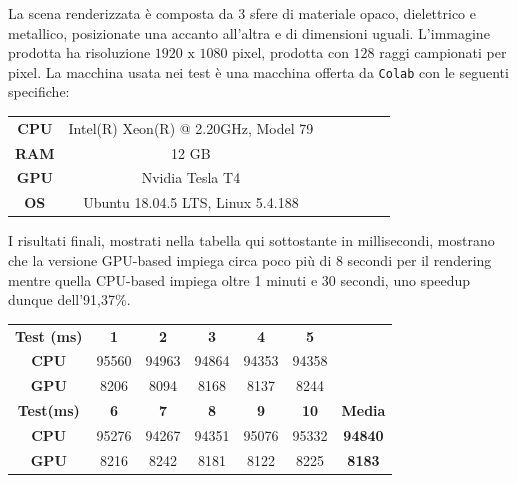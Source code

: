 \documentclass[12pt, twoside]{article}
\begin{document}
La scena renderizzata è composta da 3 sfere di materiale opaco, dielettrico
e metallico, posizionate una accanto all'altra e di dimensioni uguali.
L'immagine prodotta ha risoluzione $1920 \text{ x } 1080$ pixel, prodotta con
$128$ raggi campionati per pixel.
La macchina usata nei test è una macchina offerta da \texttt{Colab} con le
seguenti specifiche:

\begin{table}[h]
  \centering
  \begin{tabular}{ccccccc}
    \rowcolor[HTML]{EFEFEF} 
    \textbf{CPU} & Intel(R) Xeon(R) @ 2.20GHz, Model 79 \\
    \rowcolor[HTML]{FFFFFF} 
    \textbf{RAM} & 12 GB                                \\
    \rowcolor[HTML]{EFEFEF} 
    \textbf{GPU} & Nvidia Tesla T4                      \\
    \rowcolor[HTML]{FFFFFF} 
    \textbf{OS}  & Ubuntu 18.04.5 LTS, Linux 5.4.188   
  \end{tabular}
\end{table}

I risultati finali, mostrati nella tabella qui sottostante in millisecondi,
mostrano che la versione GPU-based impiega circa poco più di 8 secondi per il
rendering mentre quella CPU-based impiega oltre 1 minuti e 30 secondi,
uno speedup dunque dell'91,37\%.

\begin{table}[h]
  \centering
  \begin{tabular}{ccccccc}
    \rowcolor[HTML]{C0C0C0} 
    \textbf{Test (ms)}                   & \textbf{1}                    & \textbf{2} & \textbf{3} & \textbf{4} & \cellcolor[HTML]{C0C0C0}\textbf{5} & \textbf{}      \\
    \cellcolor[HTML]{FFFFFF}\textbf{CPU} & \cellcolor[HTML]{FFFFFF}95560 & 94963      & 94864      & 94353      & 94358                              &                \\
    \rowcolor[HTML]{EFEFEF} 
    \cellcolor[HTML]{EFEFEF}\textbf{GPU} & 8206                          & 8094       & 8168       & 8137       & 8244                               &                \\
    \rowcolor[HTML]{C0C0C0} 
    \textbf{Test(ms)}                    & \textbf{6}                    & \textbf{7} & \textbf{8} & \textbf{9} & \textbf{10}                        & \textbf{Media} \\
    \cellcolor[HTML]{FFFFFF}\textbf{CPU} & 95276                         & 94267      & 94351      & 95076      & 95332                              & \textbf{94840} \\
    \rowcolor[HTML]{EFEFEF} 
    \textbf{GPU}                         & 8216                          & 8242       & 8181       & 8122       & 8225                               & \textbf{8183} 
  \end{tabular}
\end{table}
\end{document}
